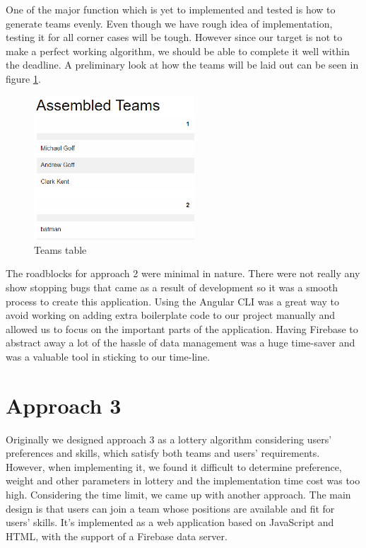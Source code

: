 \documentclass[conference]{IEEEtran}
\begin{document}
One of the major function which is yet to implemented and tested is how to generate teams evenly. Even though we have rough idea of implementation, testing it for all corner cases will be tough. However since our target is not to make a perfect working algorithm, we should be able to complete it well within the deadline. A preliminary look at how the teams will be laid out can be seen in figure \ref{teampage}.

\begin{figure}[H]
  \centering
  \includegraphics[width=6cm]{image/teams.PNG}
  \caption{Teams table}
  \label{teampage}
\end{figure}

The roadblocks for approach 2 were minimal in nature. There were not really any show stopping bugs that came as a result of development so it was a smooth process to create this application. Using the Angular CLI was a great way to avoid working on adding extra boilerplate code to our project manually and allowed us to focus on the important parts of the application. Having Firebase to abstract away a lot of the hassle of data management was a huge time-saver and was a valuable tool in sticking to our time-line. 

\section{Approach 3}
Originally we designed approach 3 as a lottery algorithm considering users' preferences and skills, which satisfy both teams and users' requirements. However, when implementing it, we found it difficult to determine preference, weight and other parameters in lottery and the implementation time cost was too high. Considering the time limit, we came up with another approach. The main design is that users can join a team whose positions are available and fit for users' skills. It's implemented as a web application based on JavaScript and HTML, with the support of a Firebase data server.
\end{document}
